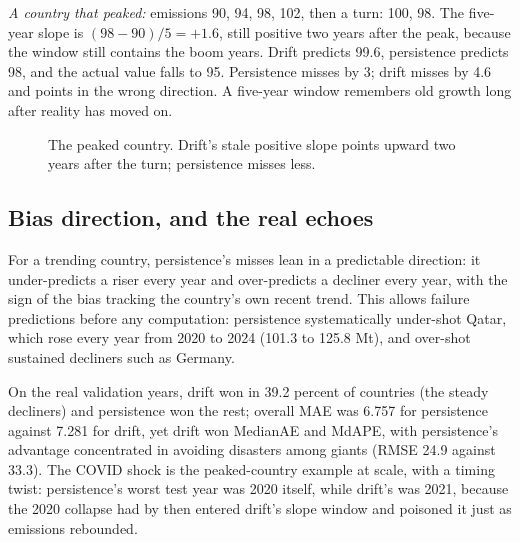 \documentclass[11pt]{article}
\begin{document}
\emph{A country that peaked:} emissions 90, 94, 98, 102, then a turn:
100, 98. The five-year slope is $(98-90)/5 = +1.6$, still positive two
years after the peak, because the window still contains the boom years.
Drift predicts 99.6, persistence predicts 98, and the actual value falls
to 95. Persistence misses by 3; drift misses by 4.6 and points in the
wrong direction. A five-year window remembers old growth long after
reality has moved on.

\begin{figure}[ht]
\centering
{}
\caption{The peaked country. Drift's stale positive slope points upward
two years after the turn; persistence misses less.}
\label{fig:turn}
\end{figure}

\subsection{Bias direction, and the real echoes}

For a trending country, persistence's misses lean in a predictable
direction: it under-predicts a riser every year and over-predicts a
decliner every year, with the sign of the bias tracking the country's own
recent trend. This allows failure predictions before any computation:
persistence systematically under-shot Qatar, which rose every year from
2020 to 2024 (101.3 to 125.8 Mt), and over-shot sustained decliners such
as Germany.

On the real validation years, drift won in 39.2 percent of countries (the
steady decliners) and persistence won the rest; overall MAE was 6.757 for
persistence against 7.281 for drift, yet drift won MedianAE and MdAPE,
with persistence's advantage concentrated in avoiding disasters among
giants (RMSE 24.9 against 33.3). The COVID shock is the peaked-country
example at scale, with a timing twist: persistence's worst test year was
2020 itself, while drift's was 2021, because the 2020 collapse had by
then entered drift's slope window and poisoned it just as emissions
rebounded.
\end{document}
